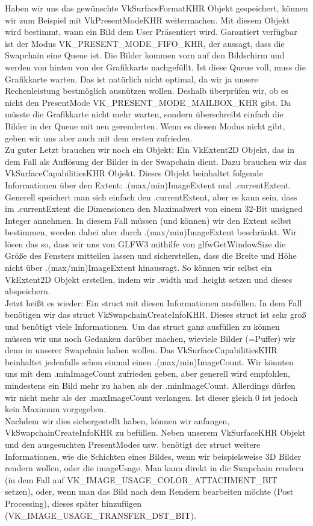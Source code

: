 \documentclass[11pt,a4paper]{report}
\begin{document}
Haben wir uns das gewünschte VkSurfaceFormatKHR Objekt gespeichert, können wir zum Beispiel mit VkPresentModeKHR weitermachen. Mit diesem Objekt wird bestimmt, wann ein Bild dem User Präsentiert wird. Garantiert verfügbar ist der Modus VK\_PRESENT\_MODE\_FIFO\_KHR, der aussagt, dass die Swapchain eine Queue ist. Die Bilder kommen vorn auf den Bildschirm und werden von hinten von der Grafikkarte nachgefüllt. Ist diese Queue voll, muss die Grafikkarte warten. Das ist natürlich nicht optimal, da wir ja unsere Rechenleistung bestmöglich ausnützen wollen. Deshalb überprüfen wir, ob es nicht den PresentMode VK\_PRESENT\_MODE\_MAILBOX\_KHR gibt. Da müsste die Grafikkarte nicht mehr warten, sondern überschreibt einfach die Bilder in der Queue mit neu gerenderten. Wenn es diesen Modus nicht gibt, geben wir uns aber auch mit dem ersten zufrieden.\\
Zu guter Letzt brauchen wir noch ein Objekt: Ein VkExtent2D Objekt, das in dem Fall als Auflösung der Bilder in der Swapchain dient. Dazu brauchen wir das VkSurfaceCapabilitiesKHR Objekt. Dieses Objekt beinhaltet folgende Informationen über den Extent: .(max/min)ImageExtent und .currentExtent. Generell speichert man sich einfach den .currentExtent, aber es kann sein, dass im .currentExtent die Dimensionen den Maximalwert von einem 32-Bit unsigned Integer annehmen. In diesem Fall müssen (und können) wir den Extent selbst bestimmen, werden dabei aber durch .(max/min)ImageExtent beschränkt. Wir lösen das so, dass wir uns von GLFW3 mithilfe von glfwGetWindowSize die Größe des Fensters mitteilen lassen und sicherstellen, dass die Breite und Höhe nicht über .(max/min)ImageExtent hinausragt. So können wir selbst ein VkExtent2D Objekt erstellen, indem wir .width und .height setzen und dieses abspeichern.\\
Jetzt heißt es wieder: Ein struct mit diesen Informationen ausfüllen. In dem Fall benötigen wir das struct VkSwapchainCreateInfoKHR. Dieses struct ist sehr groß und benötigt viele Informationen. Um das struct ganz ausfüllen zu können müssen wir uns noch Gedanken darüber machen, wieviele Bilder (=Puffer) wir denn in unserer Swapchain haben wollen. Das VkSurfaceCapabilitiesKHR beinhaltet jedenfalls schon einmal einen .(max/min)ImageCount. Wir könnten uns mit dem .minImageCount zufrieden geben, aber generell wird empfohlen, mindestens ein Bild mehr zu haben als der .minImageCount. Allerdings dürfen wir nicht mehr als der .maxImageCount verlangen. Ist dieser gleich 0 ist jedoch kein Maximum vorgegeben.\\
Nachdem wir dies sichergestellt haben, können wir anfangen, VkSwapchainCreateInfoKHR zu befüllen. Neben unserem VkSurfaceKHR Objekt und den ausgesuchten PresentModes usw. benötigt der struct weitere Informationen, wie die Schichten eines Bildes, wenn wir beispielsweise 3D Bilder rendern wollen, oder die imageUsage. Man kann direkt in die Swapchain rendern (in dem Fall auf VK\_IMAGE\_USAGE\_COLOR\_ATTACHMENT\_BIT setzen), oder, wenn man das Bild nach dem Rendern bearbeiten möchte (Post Processing), dieses später hinzufügen (VK\_IMAGE\_USAGE\_TRANSFER\_DST\_BIT).\\
\end{document}
